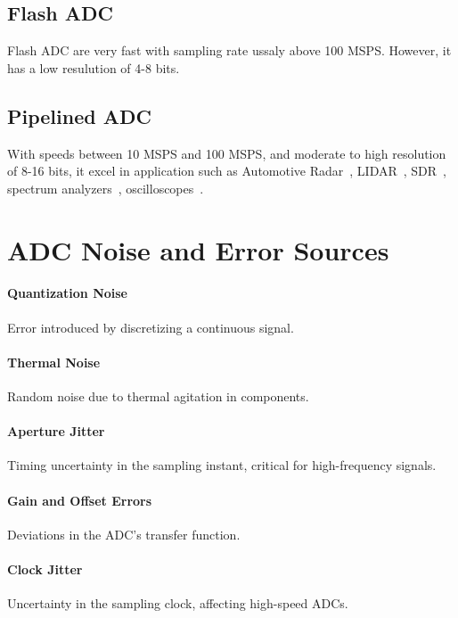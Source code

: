 \subsection{Flash ADC}
Flash ADC are very fast with sampling rate ussaly above 100 MSPS. However, it has a low resulution of 4-8 bits.

\subsection{Pipelined ADC}
With speeds between 10 MSPS and 100 MSPS, and moderate to high resolution of 8-16 bits, it excel in application such as Automotive Radar~\cite{AD9081}\cite{TI-ADC12DJ3200}, LIDAR~\cite{AD9208}\cite{TI-ADC08D1520}, SDR~\cite{AD9361}\cite{LTC2175}\cite{TI-ADC32RF45}, spectrum analyzers~\cite{AD9680}\cite{Keysight-M9703A}, oscilloscopes~\cite{AD9625}\cite{Tektronix-DPO70000SX}. %


\section{ADC Noise and Error Sources}
\paragraph{Quantization Noise} Error introduced by discretizing a continuous signal.

\paragraph{Thermal Noise} Random noise due to thermal agitation in components.

\paragraph{Aperture Jitter} Timing uncertainty in the sampling instant, critical for high-frequency signals.

\paragraph{Gain and Offset Errors} Deviations in the ADC’s transfer function.

\paragraph{Clock Jitter} Uncertainty in the sampling clock, affecting high-speed ADCs.


